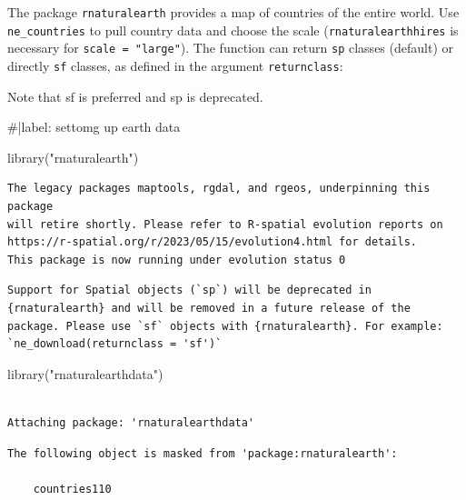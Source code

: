 \documentclass[
  letterpaper,
  DIV=11,
  numbers=noendperiod]{scrartcl}
\newenvironment{Shaded}{\begin{snugshade}}{\end{snugshade}}
\newcommand{\CommentTok}[1]{\textcolor[rgb]{0.37,0.37,0.37}{#1}}
\newcommand{\FunctionTok}[1]{\textcolor[rgb]{0.28,0.35,0.67}{#1}}
\newcommand{\NormalTok}[1]{\textcolor[rgb]{0.00,0.23,0.31}{#1}}
\newcommand{\StringTok}[1]{\textcolor[rgb]{0.13,0.47,0.30}{#1}}
\begin{document}
The package \texttt{rnaturalearth} provides a map of countries of the
entire world. Use \texttt{ne\_countries} to pull country data and choose
the scale (\texttt{rnaturalearthhires} is necessary for
\texttt{scale\ =\ "large"}). The function can return \texttt{sp} classes
(default) or directly \texttt{sf} classes, as defined in the argument
\texttt{returnclass}:

Note that sf is preferred and sp is deprecated.

\begin{Shaded}
\begin{Highlighting}[]
\CommentTok{\#|label: settomg up earth data}

\FunctionTok{library}\NormalTok{(}\StringTok{"rnaturalearth"}\NormalTok{) }
\end{Highlighting}
\end{Shaded}

\begin{verbatim}
The legacy packages maptools, rgdal, and rgeos, underpinning this package
will retire shortly. Please refer to R-spatial evolution reports on
https://r-spatial.org/r/2023/05/15/evolution4.html for details.
This package is now running under evolution status 0 
\end{verbatim}

\begin{verbatim}
Support for Spatial objects (`sp`) will be deprecated in {rnaturalearth} and will be removed in a future release of the package. Please use `sf` objects with {rnaturalearth}. For example: `ne_download(returnclass = 'sf')`
\end{verbatim}

\begin{Shaded}
\begin{Highlighting}[]
\FunctionTok{library}\NormalTok{(}\StringTok{"rnaturalearthdata"}\NormalTok{)  }
\end{Highlighting}
\end{Shaded}

\begin{verbatim}

Attaching package: 'rnaturalearthdata'
\end{verbatim}

\begin{verbatim}
The following object is masked from 'package:rnaturalearth':

    countries110
\end{verbatim}
\end{document}
